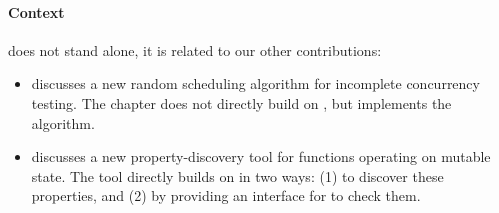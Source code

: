 \paragraph{Context}
\dejafu{} does not stand alone, it is related to our other
contributions:

\begin{itemize}
\item {} discusses a new random scheduling
  algorithm for incomplete concurrency testing.  The chapter does not
  directly build on \dejafu{}, but \dejafu{} implements the algorithm.
\item {} discusses a new property-discovery tool for
  functions operating on mutable state.  The tool directly builds on
  \dejafu{} in two ways: (1) to discover these properties, and (2) by
  providing an interface for \dejafu{} to check them.
\end{itemize}
